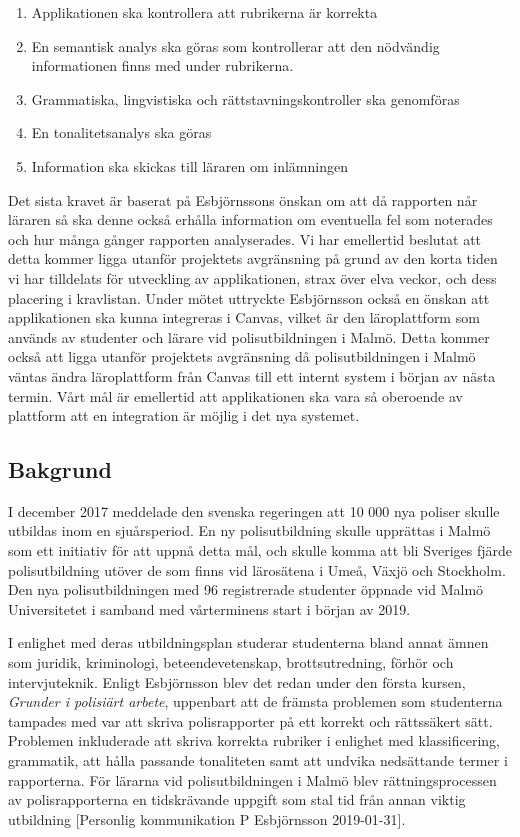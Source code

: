 \documentclass[swedish]{maucsthesis}
\begin{document}
\begin{enumerate}
\item Applikationen ska kontrollera att rubrikerna är korrekta
\item En semantisk analys ska göras som kontrollerar att den nödvändig
  informationen finns med under rubrikerna.
\item Grammatiska, lingvistiska och rättstavningskontroller ska genomföras
\item En tonalitetsanalys ska göras
\item Information ska skickas till läraren om inlämningen    
\end{enumerate}
Det sista kravet är baserat på Esbjörnssons önskan om att då rapporten når
läraren så ska denne också erhålla information om eventuella fel som noterades
och hur många gånger rapporten analyserades. Vi har emellertid beslutat att
detta kommer ligga utanför projektets avgränsning på grund av den korta tiden vi
har tilldelats för utveckling av applikationen, strax över elva veckor, och
dess placering i kravlistan. Under mötet uttryckte Esbjörnsson också en
önskan att applikationen ska kunna integreras i Canvas, vilket är den
läroplattform som används av studenter och lärare vid polisutbildningen i Malmö. Detta kommer också att ligga utanför projektets avgränsning då
polisutbildningen i Malmö väntas ändra läroplattform från Canvas till ett internt
system i början av nästa termin. Vårt mål är emellertid att applikationen ska
vara så oberoende av plattform att en integration är möjlig i det nya systemet.

\subsection{Bakgrund}
I december 2017 meddelade den svenska regeringen att 10 000 nya poliser skulle
utbildas inom en sjuårsperiod. En ny polisutbildning skulle upprättas i Malmö
som ett initiativ för att uppnå detta mål, och skulle komma att bli Sveriges
fjärde polisutbildning utöver de som finns vid lärosätena i Umeå, Växjö och
Stockholm. Den nya polisutbildningen med 96 registrerade studenter öppnade vid
Malmö Universitetet i samband med vårterminens start i början av 2019.

I enlighet med deras utbildningsplan studerar studenterna bland annat ämnen som
juridik, kriminologi, beteendevetenskap, brottsutredning, förhör och
intervjuteknik. Enligt Esbjörnsson blev det
redan under den första kursen, \textit {Grunder i polisiärt arbete}, uppenbart att de
främsta problemen som studenterna tampades med var att skriva polisrapporter på
ett korrekt och rättssäkert sätt. Problemen inkluderade att skriva korrekta
rubriker i enlighet med klassificering, grammatik, att hålla passande
tonaliteten samt att undvika nedsättande termer i rapporterna. För lärarna vid
polisutbildningen i Malmö blev rättningsprocessen av polisrapporterna en
tidskrävande uppgift som stal tid från annan viktig utbildning [Personlig kommunikation P Esbjörnsson 2019-01-31].
\end{document}
